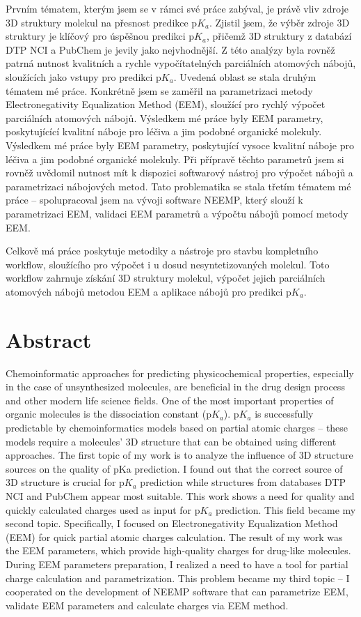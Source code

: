 \documentclass[11pt,b5paper,oneside,final]{book}
\begin{document}
Prvním tématem, kterým jsem se v rámci své práce zabýval, je právě vliv zdroje
3D struktury molekul na přesnost predikce p$K_a$. Zjistil jsem, že výběr zdroje
3D struktury je klíčový pro úspěšnou predikci p$K_a$, přičemž 3D struktury
z databází DTP NCI a PubChem je jevily jako nejvhodnější. Z této analýzy byla
rovněž patrná nutnost kvalitních a rychle vypočítatelných parciálních atomových
nábojů, sloužících jako vstupy pro predikci p$K_a$. Uvedená oblast se stala
druhým tématem mé práce. Konkrétně jsem se zaměřil na parametrizaci metody
Electronegativity Equalization Method (EEM), sloužící pro rychlý výpočet
parciálních atomových nábojů. Výsledkem mé práce byly EEM parametry,
poskytujícící kvalitní náboje pro léčiva a jim podobné organické molekuly.
Výsledkem mé práce byly EEM parametry, poskytující vysoce kvalitní náboje pro
léčiva a jim podobné organické molekuly. Při přípravě těchto parametrů jsem si
rovněž uvědomil nutnost mít k dispozici softwarový nástroj pro výpočet nábojů a
parametrizaci nábojových metod. Tato problematika se stala třetím tématem mé
práce -- spolupracoval jsem na vývoji software NEEMP, který slouží
k parametrizaci EEM, validaci EEM parametrů a výpočtu nábojů pomocí metody EEM.

Celkově má práce poskytuje metodiky a nástroje pro stavbu kompletního workflow,
sloužícího pro výpočet i u dosud nesyntetizovaných molekul. Toto workflow
zahrnuje získání 3D struktury molekul, výpočet jejich parciálních atomových
nábojů metodou EEM a aplikace nábojů pro predikci p$K_a$.
\clearpage

\section*{Abstract}
Chemoinformatic approaches for predicting physicochemical properties, especially
in the case of unsynthesized molecules, are beneficial in the drug design
process and other modern life science fields. One of the most important
properties of organic molecules is the dissociation constant (p$K_a$). p$K_a$ is
successfully predictable by chemoinformatics models based on partial atomic
charges -- these models require a molecules’ 3D structure that can be obtained
using different approaches. The first topic of my work is to analyze
the influence of 3D structure sources on the quality of pKa prediction. I found
out that the correct source of 3D structure is crucial for p$K_a$ prediction
while structures from databases DTP NCI and PubChem appear most suitable. This
work shows a need for quality and quickly calculated charges used as input for
p$K_a$ prediction. This field became my second topic. Specifically, I focused
on Electronegativity Equalization Method (EEM) for quick partial atomic charges
calculation. The result of my work was the EEM parameters, which provide
high-quality charges for drug-like molecules. During EEM parameters preparation,
I realized a need to have a tool for partial charge calculation and
parametrization. This problem became my third topic -- I cooperated
on the development of NEEMP software that can parametrize EEM, validate EEM
parameters and calculate charges via EEM method.
\end{document}

